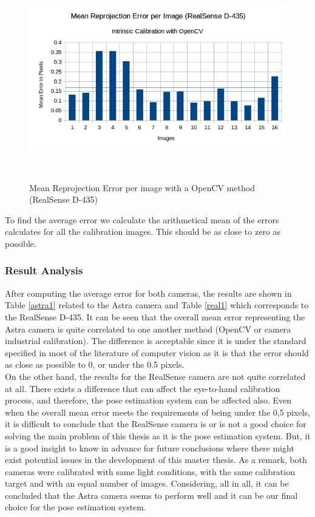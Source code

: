\begin{figure}[!h]
\begin{center}
\includegraphics[width=5in, height=3.5in]{figures05/opencv_int_cal_real.png}
\caption{Mean Reprojection Error per image with a OpenCV method (RealSense D-435)}%
\label{fig:realopen}
\end{center}
\end{figure}

To find the average error we calculate the arithmetical mean of the errors calculates for all the calibration images. This should be as close to zero as possible. 

\subsubsection{Result Analysis}
After computing the average error for both cameras, the results are shown in Table \ref{astra1} related to the Astra camera and Table \ref{real1} which corresponds to the RealSense D-435. It can be seen that the overall mean error representing the Astra camera is quite correlated to one another method (OpenCV or camera \textunderscore industrial calibration). The difference is acceptable since it is under the standard specified in most of the literature of computer vision as it is that the error should as close as possible to 0, or under the 0.5 pixels.\\
On the other hand, the results for the RealSense camera are not quite correlated at all. There exists a difference that can affect the eye-to-hand calibration process, and therefore, the pose estimation system can be affected also. Even when the overall mean error meets the requirements of being under the 0,5 pixels, it is difficult to conclude that the RealSense camera is or is not a good choice for solving the main problem of this thesis as it is the pose estimation system. But, it is a good insight to know in advance for future conclusions where there might exist potential issues in the development of this master thesis.
As a remark, both cameras were calibrated with same light conditions, with the same calibration target and with an equal number of images. Considering, all in all, it can be concluded that the Astra camera seems to perform well and it can be our final choice for the pose estimation system.

